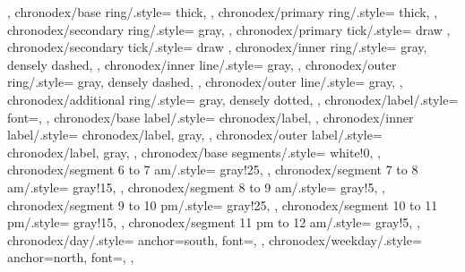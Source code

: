 {{    },
    chronodex/base ring/.style={
        thick,
    },
    chronodex/primary ring/.style={
        thick,
    },
    chronodex/secondary ring/.style={
        gray,
    },
    chronodex/primary tick/.style={
        draw
    },
    chronodex/secondary tick/.style={
        draw
    },
    chronodex/inner ring/.style={
        gray,
        densely dashed,
    },
    chronodex/inner line/.style={
        gray,
    },
    chronodex/outer ring/.style={
        gray,
        densely dashed,
    },
    chronodex/outer line/.style={
        gray,
    },
    chronodex/additional ring/.style={
        gray,
        densely dotted,
    },
    chronodex/label/.style={
        font=\footnotesize,
    },
    chronodex/base label/.style={
        chronodex/label,
    },
    chronodex/inner label/.style={
        chronodex/label,
        gray,
    },
    chronodex/outer label/.style={
        chronodex/label,
        gray,
    },
    chronodex/base segments/.style={
        white!0,
    },
    chronodex/segment 6 to 7 am/.style={
        gray!25,
    },
    chronodex/segment 7 to 8 am/.style={
        gray!15,
    },
    chronodex/segment 8 to 9 am/.style={
        gray!5,
    },
    chronodex/segment 9 to 10 pm/.style={
        gray!25,
    },
    chronodex/segment 10 to 11 pm/.style={
        gray!15,
    },
    chronodex/segment 11 pm to 12 am/.style={
        gray!5,
    },
    chronodex/day/.style={
        anchor=south,
        font=\Huge,
    },
    chronodex/weekday/.style={
        anchor=north,
        font=\large,
    },
}%
